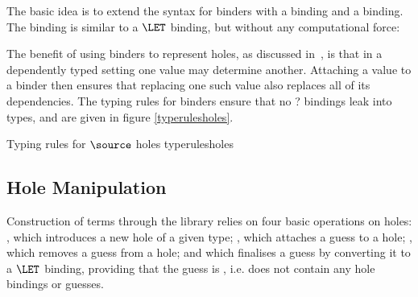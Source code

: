 The basic idea is to extend the syntax for binders with a 
binding and a  binding. The  binding is
similar to a $\LET$ binding, but without any computational force:


The benefit of using binders to represent holes, as discussed
in~\cite{mcbride-thesis}, is that in a dependently typed setting one
value may determine another. Attaching a value to a binder then
ensures that replacing one such value also replaces all of its
dependencies. The typing rules for binders ensure that no ? bindings
leak into types, and are given in figure \ref{typerulesholes}.

{Typing rules for $\source$ holes}
{typerulesholes}

\subsection{Hole Manipulation}

\label{holeops}

Construction of terms through the \Ivor{} library relies on four basic
operations on holes: , which introduces a new hole of a
given type; , which attaches a guess to a hole;
, which removes a guess from a hole; and 
which finalises a guess by converting it to a $\LET$ binding,
providing that the guess is , i.e. does not contain any
hole bindings or guesses.



